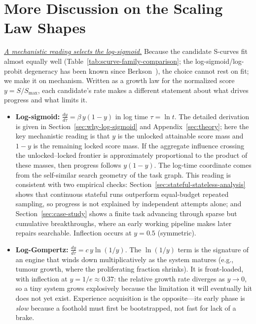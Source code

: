 \section{More Discussion on the Scaling Law Shapes}
\label{sec:scaling-law-discussion}
\label{sec:scurve-mechanistic-reading}

\underline{\textit{A mechanistic reading selects the log-sigmoid.}}
Because the candidate S-curves fit almost equally well
(Table~\ref{tab:scurve-family-comparison}; the log-sigmoid/log-probit degeneracy
has been known since Berkson~\citep{berkson1944application}), the choice cannot
rest on fit; we make it on mechanism. Written as a growth law for the normalized
score $y=S/S_{\max}$, each candidate's rate makes a different statement about
what drives progress and what limits it.
\begin{itemize}
  \item \textbf{Log-sigmoid:} $\frac{dy}{d\tau}=\beta\,y(1-y)$ in log time
  $\tau=\ln t$. The detailed derivation is given in
  Section~\ref{sec:why-log-sigmoid} and Appendix~\ref{sec:theory}; here the key
  mechanistic reading is that \(y\) is the unlocked attainable score mass and
  \(1-y\) is the remaining locked score mass. If the aggregate influence crossing
  the unlocked--locked frontier is approximately proportional to the product of
  these masses, then progress follows \(y(1-y)\). The log-time coordinate comes
  from the self-similar search geometry of the task graph. This reading is
  consistent with two empirical checks: Section~\ref{sec:stateful-stateless-analysis}
  shows that continuous stateful runs outperform equal-budget repeated sampling,
  so progress is not explained by independent attempts alone; and
  Section~\ref{sec:case-study} shows a finite task advancing through sparse but
  cumulative breakthroughs, where an early working pipeline makes later repairs
  searchable. Inflection occurs at \(y=0.5\) (symmetric).

  \item \textbf{Log-Gompertz:} $\frac{dy}{d\tau}=c\,y\ln(1/y)$. The
  $\ln(1/y)$ term is the signature of an engine that winds down
  multiplicatively as the system matures (e.g., tumour growth, where the
  proliferating fraction shrinks). It is front-loaded, with inflection at
  $y=1/e\approx0.37$: the relative growth rate diverges as $y\to0$, so a tiny
  system grows explosively because the limitation it will eventually hit does
  not yet exist. Experience acquisition is the opposite---its early phase is
  \emph{slow} because a foothold must first be bootstrapped, not fast for lack
  of a brake.


\end{itemize}
